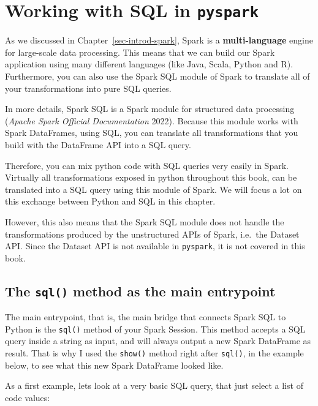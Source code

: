 \documentclass[
  11pt,
  letterpaper,
  DIV=11,
  numbers=noendperiod]{scrreprt}
\begin{document}

\chapter{\texorpdfstring{Working with SQL in
\texttt{pyspark}}{Working with SQL in pyspark}}\label{sec-dataframe-sql-chapter}

As we discussed in Chapter~\ref{sec-introd-spark}, Spark is a
\textbf{multi-language} engine for large-scale data processing. This
means that we can build our Spark application using many different
languages (like Java, Scala, Python and R). Furthermore, you can also
use the Spark SQL module of Spark to translate all of your
transformations into pure SQL queries.

In more details, Spark SQL is a Spark module for structured data
processing (\emph{Apache Spark Official Documentation} 2022). Because
this module works with Spark DataFrames, using SQL, you can translate
all transformations that you build with the DataFrame API into a SQL
query.

Therefore, you can mix python code with SQL queries very easily in
Spark. Virtually all transformations exposed in python throughout this
book, can be translated into a SQL query using this module of Spark. We
will focus a lot on this exchange between Python and SQL in this
chapter.

However, this also means that the Spark SQL module does not handle the
transformations produced by the unstructured APIs of Spark, i.e.~the
Dataset API. Since the Dataset API is not available in \texttt{pyspark},
it is not covered in this book.

\section{\texorpdfstring{The \texttt{sql()} method as the main
entrypoint}{The sql() method as the main entrypoint}}\label{the-sql-method-as-the-main-entrypoint}

The main entrypoint, that is, the main bridge that connects Spark SQL to
Python is the \texttt{sql()} method of your Spark Session. This method
accepts a SQL query inside a string as input, and will always output a
new Spark DataFrame as result. That is why I used the \texttt{show()}
method right after \texttt{sql()}, in the example below, to see what
this new Spark DataFrame looked like.

As a first example, lets look at a very basic SQL query, that just
select a list of code values:
\end{document}
